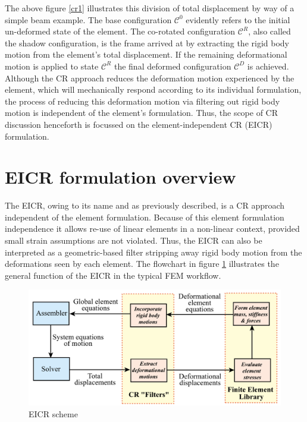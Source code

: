 The above figure \ref{cr1} illustrates this division of total displacement by way of a simple beam example. The base configuration $\mathscr{C}^0$ evidently refers to the initial un-deformed state of the element. The co-rotated configuration $\mathscr{C}^R$, also called the shadow configuration, is the frame arrived at by extracting the rigid body motion from the element's total displacement. If the remaining deformational motion is applied to state $\mathscr{C}^R$ the final deformed configuration $\mathscr{C}^D$ is achieved. Although the CR approach reduces the deformation motion experienced by the element, which will mechanically respond according to its individual formulation, the process of reducing this deformation motion via filtering out rigid body motion is independent of the element's formulation. Thus, the scope of CR discussion henceforth is focussed on the element-independent CR (EICR) formulation.

\section{EICR formulation overview}
\label{EICR overview}
The EICR, owing to its name and as previously described, is a CR approach independent of the element formulation. Because of this element formulation independence it allows re-use of linear elements in a non-linear context, provided small strain assumptions are not violated. Thus, the EICR can also be interpreted as a geometric-based filter stripping away rigid body motion from the deformations seen by each element. The flowchart in figure \ref{cr3} illustrates the general function of the EICR in the typical FEM workflow.

\begin{figure}[H]
	\centering
	\def\svgwidth{\columnwidth}
	\includegraphics[width=14cm]{images/cr_3.png}
	\caption{EICR scheme \cite{FelippaCR1_2016}}
	\label{cr3}
\end{figure}

